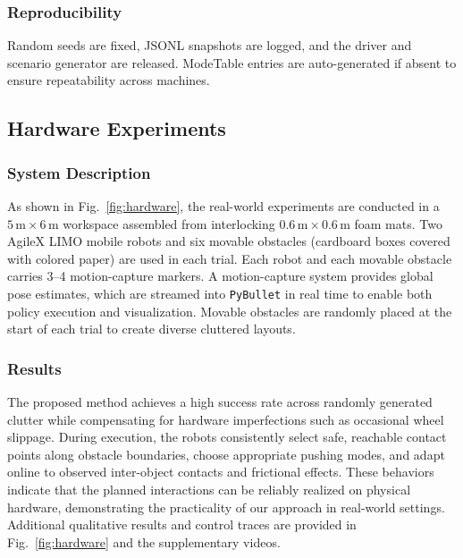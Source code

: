 \subsubsection{Reproducibility}
\label{subsec:repro}
Random seeds are fixed, JSONL snapshots are logged, and the driver and
scenario generator are released. ModeTable entries are auto-generated if
absent to ensure repeatability across machines.

\subsection{Hardware Experiments}\label{subsec:hardware}
{
\subsubsection{System Description}\label{subsec:exp-description}
As shown in Fig.~\ref{fig:hardware},
the real-world experiments are conducted in a $5\,\mathrm{m}\times6\,\mathrm{m}$ workspace assembled from interlocking $0.6\,\mathrm{m}\times0.6\,\mathrm{m}$ foam mats. 
Two AgileX LIMO mobile robots and six movable obstacles (cardboard boxes covered with colored paper) are used in each trial. 
Each robot and each movable obstacle carries 3--4 motion-capture markers.
A motion-capture system provides global pose estimates, which are streamed into \texttt{PyBullet} in real time to enable both policy execution and visualization.
Movable obstacles are randomly placed at the start of each trial to create diverse cluttered layouts.

\subsubsection{Results}\label{subsec:exp-results}
The proposed method achieves a high success rate across randomly generated clutter while compensating for hardware imperfections such as occasional wheel slippage.
During execution, the robots consistently select safe, reachable contact points along obstacle boundaries, choose appropriate pushing modes, and adapt online to observed inter-object contacts and frictional effects.
These behaviors indicate that the planned interactions can be reliably realized on physical hardware, demonstrating the practicality of our approach in real-world settings. 
Additional qualitative results and control traces are provided in Fig.~\ref{fig:hardware} and the supplementary videos.
}